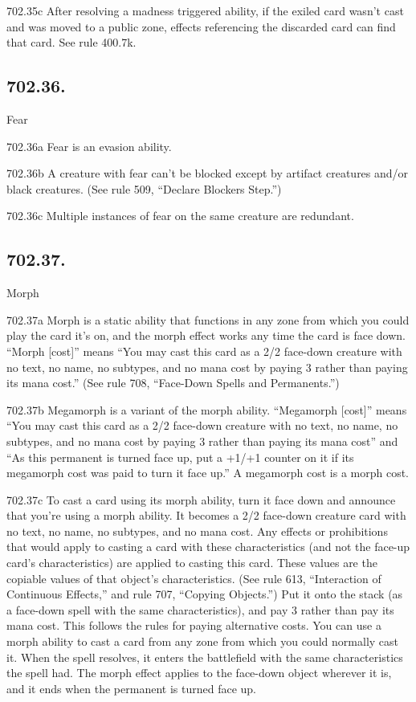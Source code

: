 702.35c After resolving a madness triggered ability, if the exiled card wasn’t cast and was moved to a public zone, effects referencing the discarded card can find that card. See rule 400.7k.

\subsection*{702.36.}
Fear

702.36a Fear is an evasion ability.

702.36b A creature with fear can’t be blocked except by artifact creatures and/or black creatures. (See rule 509, “Declare Blockers Step.”)

702.36c Multiple instances of fear on the same creature are redundant.

\subsection*{702.37.}
Morph

702.37a Morph is a static ability that functions in any zone from which you could play the card it’s on, and the morph effect works any time the card is face down. “Morph [cost]” means “You may cast this card as a 2/2 face-down creature with no text, no name, no subtypes, and no mana cost by paying {3} rather than paying its mana cost.” (See rule 708, “Face-Down Spells and Permanents.”)

702.37b Megamorph is a variant of the morph ability. “Megamorph [cost]” means “You may cast this card as a 2/2 face-down creature with no text, no name, no subtypes, and no mana cost by paying {3} rather than paying its mana cost” and “As this permanent is turned face up, put a +1/+1 counter on it if its megamorph cost was paid to turn it face up.” A megamorph cost is a morph cost.

702.37c To cast a card using its morph ability, turn it face down and announce that you’re using a morph ability. It becomes a 2/2 face-down creature card with no text, no name, no subtypes, and no mana cost. Any effects or prohibitions that would apply to casting a card with these characteristics (and not the face-up card’s characteristics) are applied to casting this card. These values are the copiable values of that object’s characteristics. (See rule 613, “Interaction of Continuous Effects,” and rule 707, “Copying Objects.”) Put it onto the stack (as a face-down spell with the same characteristics), and pay {3} rather than pay its mana cost. This follows the rules for paying alternative costs. You can use a morph ability to cast a card from any zone from which you could normally cast it. When the spell resolves, it enters the battlefield with the same characteristics the spell had. The morph effect applies to the face-down object wherever it is, and it ends when the permanent is turned face up.


